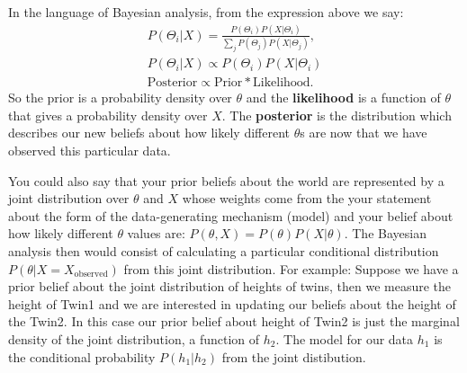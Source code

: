 In the language of Bayesian analysis, from the expression above we say:
\begin{align}
P(\Theta_i|X) = \frac{P(\Theta_i)P(X|\Theta_i)}{\sum_jP(\Theta_j)P(X|\Theta_j)},\\
P(\Theta_i|X) \propto P(\Theta_i)P(X|\Theta_i)\\
\textrm{Posterior}\propto \textrm{Prior}*\textrm{Likelihood}.
\end{align}
So the prior is a probability density over $\theta$ and the \textbf{likelihood} is a function of $\theta$ that gives a probability density over $X$. The \textbf{posterior} is the distribution which describes our new beliefs about how likely different $\theta$s are now that we have observed this particular data.
\nn

You could also say that your prior beliefs about the world are represented by a joint distribution over $\theta$ and $X$ whose weights come from the your statement about the form of the data-generating mechanism (model) and your belief about how likely different $\theta$ values are: $P(\theta, X) = P(\theta)P(X|\theta)$. The Bayesian analysis then would consist of calculating a particular conditional distribution $P(\theta|X=X_{\text{observed}})$ from this joint distribution. For example: Suppose we have a prior belief about the joint distribution of heights of twins, then we measure the height of Twin1 and we are interested in updating our beliefs about the height of the Twin2. In this case our prior belief about height of Twin2 is just the marginal density of the joint distribution, a function of $h_2$. The model for our data $h_1$ is the conditional probability $P(h_1|h_2)$ from the joint distibution.
\nn


